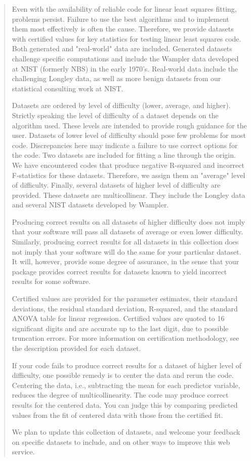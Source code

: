 \documentclass[10pt]{article}
\begin{document}
\begin{quote}
Even with the availability of reliable code for linear least squares fitting, problems persist. Failure to use the best algorithms and to implement them most effectively is often the cause. Therefore, we provide datasets with certified values for key statistics for testing linear least squares code. 
Both generated and "real-world" data are included. Generated datasets challenge specific computations and include the Wampler data developed at NIST (formerly NBS) in the early 1970's. Real-world data include the challenging Longley data, as well as more benign datasets from our statistical consulting work at NIST. 

Datasets are ordered by level of difficulty (lower, average, and higher). Strictly speaking the level of difficulty of a dataset depends on the algorithm used. These levels are intended to provide rough guidance for the user. Datasets of lower level of difficulty should pose few problems for most code. Discrepancies here may indicate a failure to use correct options for the code. Two datasets are included for fitting a line through the origin. We have encountered codes that produce negative R-squared and incorrect F-statistics for these datasets. Therefore, we assign them an "average" level of difficulty. Finally, several datasets of higher level of difficulty are provided. These datasets are multicollinear. They include the Longley data and several NIST datasets developed by Wampler. 

Producing correct results on all datasets of higher difficulty does not imply that your software will pass all datasets of average or even lower difficulty. Similarly, producing correct results for all datasets in this collection does not imply that your software will do the same for your particular dataset. It will, however, provide some degree of assurance, in the sense that your package provides correct results for datasets known to yield incorrect results for some software. 

Certified values are provided for the parameter estimates, their standard deviations, the residual standard deviation, R-squared, and the standard ANOVA table for linear regression. Certified values are quoted to 16 significant digits and are accurate up to the last digit, due to possible truncation errors. For more information on certification methodology, see the description provided for each dataset. 

If your code fails to produce correct results for a dataset of higher level of difficulty, one possible remedy is to center the data and rerun the code. Centering the data, i.e., subtracting the mean for each predictor variable, reduces the degree of multicollinearity. The code may produce correct results for the centered data. You can judge this by comparing predicted values from the fit of centered data with those from the certified fit. 

We plan to update this collection of datasets, and welcome your feedback on specific datasets to include, and on other ways to improve this web service.
\end{quote}
\end{document}
